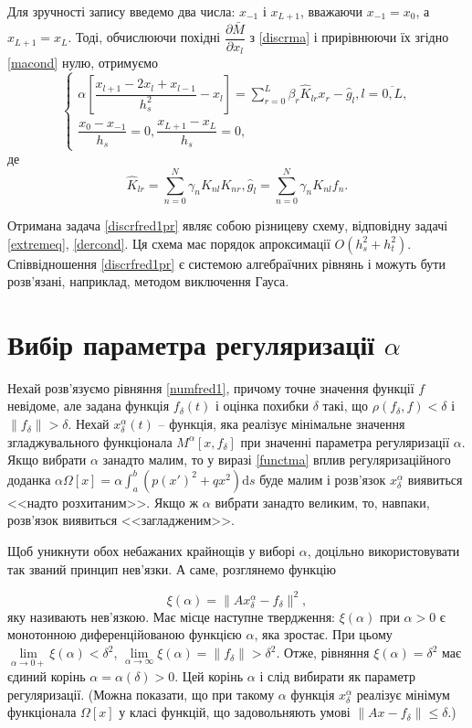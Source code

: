 \documentclass[14pt,twoside]{extreport}
\theoremstyle{mystyle}
\numberwithin{equation}{chapter}
\begin{document}
Для зручності запису введемо два числа: $x_{-1}$ і $x_{L+1}$, вважаючи $x_{-1}=x_0$, а $x_{L+1} = x_L$. Тоді, обчислюючи похідні $\dfrac{\partial \bar{M}}{\partial x_l}$ з \eqref{discrma} і прирівнюючи їх згідно \eqref{macond} нулю, отримуємо 
\begin{equation}\label{discrfred1pr}
 \left\{
\begin{array}{l}
 \alpha\left[\dfrac{x_{l+1} - 2 x_l + x_{l-1}}{h_s^2} - x_l\right] = \sum\limits_{r=0}^{L} \beta_r \hat{K}_{lr} x_r - \hat{g}_l, l=\overline{0, L},\\
 \dfrac{x_0-x_{-1}}{h_s} = 0, \dfrac{x_{L+1} - x_L}{h_s} = 0,
\end{array}
\right.
\end{equation}
де
\[
 \hat{K}_{lr} = \sum\limits_{n=0}^{N} \gamma_n K_{nl}K_{nr}, \hat{g}_l = \sum\limits_{n=0}^{N} \gamma_nK_{nl}f_n.
\]

Отримана задача \eqref{discrfred1pr} являє собою різницеву схему, відповідну задачі \eqref{extremeq}, \eqref{dercond}. Ця схема має порядок апроксимації $O(h_s^2 + h_t^2)$. Співвідношення \eqref{discrfred1pr} є системою алгебраїчних рівнянь і можуть бути розв'язані, наприклад, методом виключення Гауса.

\section{Вибір параметра регуляризації \texorpdfstring{$\alpha$}{alpha}}

Нехай розв'язуємо рівняння \eqref{numfred1}, причому точне значення функції $f$ невідоме, але задана функція $f_\delta (t)$ і оцінка похибки $\delta$ такі, що $\rho(f_\delta, f) < \delta$ і $\|f_\delta\| > \delta$. Нехай $x_\delta^\alpha (t)$ -- функція, яка реалізує мінімальне значення згладжувального функціонала $M^{\alpha} [x, f_\delta]$ при значенні параметра регуляризації $\alpha$. Якщо вибрати $\alpha$ занадто малим, то у виразі \eqref{functma} вплив регуляризаційного доданка $\alpha \Omega[x] = \alpha \int_{a}^{b} (p(x')^2 + qx^2)\mathrm{d}s$ буде малим і розв'язок $x_\delta^\alpha$ виявиться <<надто розхитаним>>. Якщо ж $\alpha$ вибрати занадто великим, то, навпаки, розв'язок виявиться <<загладженим>>.

Щоб уникнути обох небажаних крайнощів у виборі $\alpha$, доцільно використовувати так званий принцип нев'язки. А саме, розглянемо функцію

\begin{equation}\label{discrepancy}
 \xi(\alpha) = \|Ax_\delta^\alpha - f_\delta\|^2,
\end{equation}
яку називають нев'язкою. Має місце наступне твердження: $\xi(\alpha)$ при $\alpha > 0$ є монотонною диференційованою функцією $\alpha$, яка зростає. При цьому $\lim\limits_{\alpha \to 0+} \xi(\alpha) < \delta^2$, $\lim\limits_{\alpha \to \infty} \xi(\alpha) = \|f_\delta\| > \delta^2$. Отже, рівняння $\xi(\alpha) = \delta^2$ має єдиний корінь $\alpha = \alpha(\delta) > 0$. Цей корінь $\alpha$ і слід вибирати як параметр регуляризації. (Можна показати, що при такому $\alpha$ функція $x_\delta^\alpha$ реалізує мінімум функціонала $\Omega[x]$ у класі функцій, що задовольняють умові $\|Ax - f_\delta\| \leqslant \delta$.)
\end{document}
